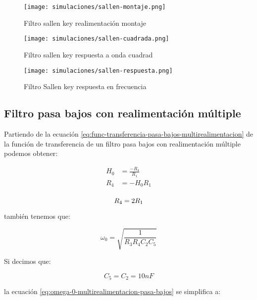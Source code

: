\begin{figure}[ht]
    \centering
    \texttt{[image: simulaciones/sallen-montaje.png]}
    \caption{Filtro sallen key  realimentación montaje}\label{fig:sim-sallen-montaje} 
\end{figure}

\begin{figure}[ht]
    \centering
    \texttt{[image: simulaciones/sallen-cuadrada.png]}
    \caption{Filtro sallen key respuesta a onda cuadrad  }
    \label{fig:sim-sallen-cuadrada} 
\end{figure}

\begin{figure}[ht]
    \centering
    \texttt{[image: simulaciones/sallen-respuesta.png]}
    \caption{Filtro Sallen key respuesta en frecuencia  }
\end{figure}

\subsection{Filtro pasa bajos con realimentación múltiple}

Partiendo de la ecuación \ref{eq:func-transferencia-pasa-bajos-multirealimentacion} de la función de transferencia de un filtro pasa bajos con realimentación múltiple podemos obtener:

\begin{align*}
    H_0 &= \frac{-R_4}{R_1} \\
    R_4 &= - H_0 R_1 \\
\end{align*}

\begin{equation}
    R_4 = 2 R_1\\
    \label{eq:r4-multirealimentacion-pasa-bajos}
\end{equation}

también tenemos que: 

\begin{equation}
    \omega_0 = \sqrt{\frac{1}{R_3 R_4 C_2 C_5}}
    \label{eq:omega-0-multirealimentacion-pasa-bajos}
\end{equation}

Si decimos que: 

\begin{equation*}
    \boxed{C_5 = C_2 = 10nF}
\end{equation*}

la ecuación \ref{eq:omega-0-multirealimentacion-pasa-bajos} se simplifica a:

